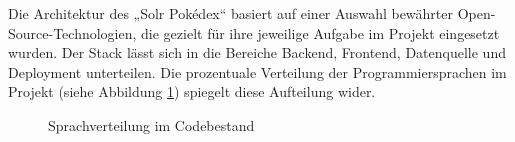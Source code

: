 Die Architektur des „Solr Pokédex“ basiert auf einer Auswahl bewährter Open-Source-Technologien, die gezielt für ihre jeweilige Aufgabe im Projekt eingesetzt wurden. Der Stack lässt sich in die Bereiche Backend, Frontend, Datenquelle und Deployment unterteilen. Die prozentuale Verteilung der Programmiersprachen im Projekt (siehe Abbildung \ref{fig:language-distribution}) spiegelt diese Aufteilung wider.

\begin{figure}[h!]
    \centering
    \caption{Sprachverteilung im Codebestand}
    \label{fig:language-distribution}
\end{figure}


